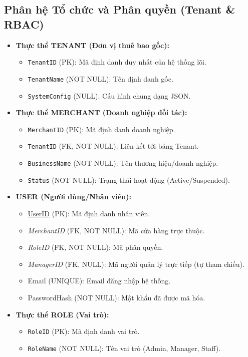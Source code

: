 \subsection{Phân hệ Tổ chức và Phân quyền (Tenant \& RBAC)}
\begin{itemize}
    \item \textbf{Thực thể TENANT (Đơn vị thuê bao gốc):}
    \begin{itemize}
        \item \texttt{TenantID} (PK): Mã định danh duy nhất của hệ thống lõi.
        \item \texttt{TenantName} (NOT NULL): Tên định danh gốc.
        \item \texttt{SystemConfig} (NULL): Cấu hình chung dạng JSON.
    \end{itemize}

    \item \textbf{Thực thể MERCHANT (Doanh nghiệp đối tác):}
    \begin{itemize}
        \item \texttt{MerchantID} (PK): Mã định danh doanh nghiệp.
        \item \texttt{TenantID} (FK, NOT NULL): Liên kết tới bảng Tenant.
        \item \texttt{BusinessName} (NOT NULL): Tên thương hiệu/doanh nghiệp.
        \item \texttt{Status} (NOT NULL): Trạng thái hoạt động (Active/Suspended).
    \end{itemize}
    
    \item \textbf{USER (Người dùng/Nhân viên):}
    \begin{itemize}
        \item \underline{UserID} (PK): Mã định danh nhân viên.
        \item \textit{MerchantID} (FK, NOT NULL): Mã cửa hàng trực thuộc.
        \item \textit{RoleID} (FK, NOT NULL): Mã phân quyền.
        \item \textit{ManagerID} (FK, NULL): Mã người quản lý trực tiếp (tự tham chiếu).
        \item Email (UNIQUE): Email đăng nhập hệ thống.
        \item PasswordHash (NOT NULL): Mật khẩu đã được mã hóa.
    \end{itemize}

    \item \textbf{Thực thể ROLE (Vai trò):}
    \begin{itemize}
        \item \texttt{RoleID} (PK): Mã định danh vai trò.
        \item \texttt{RoleName} (NOT NULL): Tên vai trò (Admin, Manager, Staff).
    \end{itemize}
\end{itemize}

